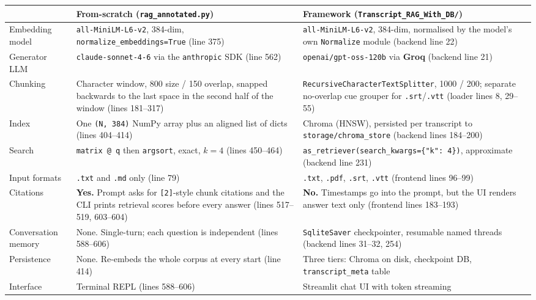 \documentclass[11pt,a4paper]{article}
\begin{document}
\begin{longtable}{@{}R{3.1cm}R{5.9cm}R{6.1cm}@{}}
\toprule
& \textbf{From-scratch (\texttt{rag\_annotated.py})} &
  \textbf{Framework (\texttt{Transcript\_RAG\_With\_DB/})} \\
\midrule
\endhead
Embedding model &
\texttt{all-MiniLM-L6-v2}, 384-dim, \texttt{normalize\_embeddings=True}
(line 375) &
\texttt{all-MiniLM-L6-v2}, 384-dim, normalised by the model's own
\texttt{Normalize} module (backend line 22) \\
\addlinespace
Generator LLM &
\texttt{claude-sonnet-4-6} via the \texttt{anthropic} SDK (line 562) &
\texttt{openai/gpt-oss-120b} via \textbf{Groq} (backend line 21) \\
\addlinespace
Chunking &
Character window, 800 size / 150 overlap, snapped backwards to the last space in
the second half of the window (lines 181--317) &
\texttt{RecursiveCharacterTextSplitter}, 1000 / 200; separate no-overlap cue
grouper for \texttt{.srt}/\texttt{.vtt} (loader lines 8, 29--55) \\
\addlinespace
Index &
One \texttt{(N, 384)} NumPy array plus an aligned list of dicts (lines 404--414) &
Chroma (HNSW), persisted per transcript to
\texttt{storage/chroma\_store} (backend lines 184--200) \\
\addlinespace
Search &
\texttt{matrix @ q} then \texttt{argsort}, exact, $k=4$ (lines 450--464) &
\texttt{as\_retriever(search\_kwargs=\{"k": 4\})}, approximate
(backend line 231) \\
\addlinespace
Input formats &
\texttt{.txt} and \texttt{.md} only (line 79) &
\texttt{.txt}, \texttt{.pdf}, \texttt{.srt}, \texttt{.vtt} (frontend lines 96--99) \\
\addlinespace
Citations &
\textbf{Yes.} Prompt asks for \texttt{[2]}-style chunk citations and the CLI
prints retrieval scores before every answer (lines 517--519, 603--604) &
\textbf{No.} Timestamps go into the prompt, but the UI renders answer text only
(frontend lines 183--193) \\
\addlinespace
Conversation memory &
None. Single-turn; each question is independent (lines 588--606) &
\texttt{SqliteSaver} checkpointer, resumable named threads
(backend lines 31--32, 254) \\
\addlinespace
Persistence &
None. Re-embeds the whole corpus at every start (line 414) &
Three tiers: Chroma on disk, checkpoint DB, \texttt{transcript\_meta} table \\
\addlinespace
Interface &
Terminal REPL (lines 588--606) &
Streamlit chat UI with token streaming \\
\bottomrule
\end{longtable}
\end{document}
